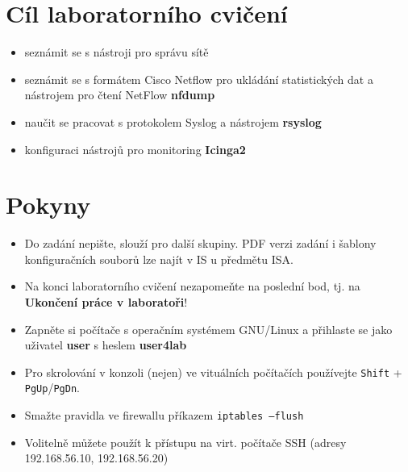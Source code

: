%
\section*{Cíl laboratorního cvičení}
\begin{itemize}
  \item seznámit se s nástroji pro správu sítě
  \item seznámit se s formátem Cisco Netflow pro ukládání statistických dat a nástrojem pro čtení NetFlow {\bf nfdump}
  \item naučit se pracovat s protokolem Syslog a nástrojem {\bf rsyslog}
  \item konfiguraci nástrojů pro monitoring {\bf Icinga2}
\end{itemize}

\section*{Pokyny}
\begin{itemize}
  \item Do zadání nepište, slouží pro další skupiny. PDF verzi zadání
  i šablony konfiguračních souborů lze najít v IS u předmětu ISA.
  
  \item Na konci laboratorního cvičení nezapomeňte na poslední bod,
  tj. na {\bf Ukončení práce v laboratoři}!
  
  \item Zapněte si počítače s operačním systémem GNU/Linux a přihlaste se jako uživatel {\bf user} s heslem {\bf user4lab}
  \item Pro skrolování v konzoli (nejen) ve vituálních počítačích používejte
    \texttt{Shift} + \texttt{PgUp}/\texttt{PgDn}.
  
  \item Smažte pravidla ve firewallu příkazem {\tt iptables --flush}
  
  \item Volitelně můžete použít k přístupu na virt. počítače SSH (adresy 192.168.56.10, 192.168.56.20)
\end{itemize}

\newpage

